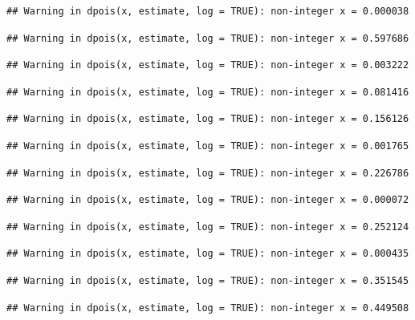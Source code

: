 \documentclass[]{article}
\begin{document}
\begin{verbatim}
## Warning in dpois(x, estimate, log = TRUE): non-integer x = 0.000038
\end{verbatim}

\begin{verbatim}
## Warning in dpois(x, estimate, log = TRUE): non-integer x = 0.597686
\end{verbatim}

\begin{verbatim}
## Warning in dpois(x, estimate, log = TRUE): non-integer x = 0.003222
\end{verbatim}

\begin{verbatim}
## Warning in dpois(x, estimate, log = TRUE): non-integer x = 0.081416
\end{verbatim}

\begin{verbatim}
## Warning in dpois(x, estimate, log = TRUE): non-integer x = 0.156126
\end{verbatim}

\begin{verbatim}
## Warning in dpois(x, estimate, log = TRUE): non-integer x = 0.001765
\end{verbatim}

\begin{verbatim}
## Warning in dpois(x, estimate, log = TRUE): non-integer x = 0.226786
\end{verbatim}

\begin{verbatim}
## Warning in dpois(x, estimate, log = TRUE): non-integer x = 0.000072
\end{verbatim}

\begin{verbatim}
## Warning in dpois(x, estimate, log = TRUE): non-integer x = 0.252124
\end{verbatim}

\begin{verbatim}
## Warning in dpois(x, estimate, log = TRUE): non-integer x = 0.000435
\end{verbatim}

\begin{verbatim}
## Warning in dpois(x, estimate, log = TRUE): non-integer x = 0.351545
\end{verbatim}

\begin{verbatim}
## Warning in dpois(x, estimate, log = TRUE): non-integer x = 0.449508
\end{verbatim}
\end{document}
